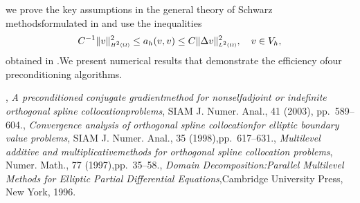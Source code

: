 \documentclass{report}
\begin{document}
we prove the key assumptions in the general theory of Schwarz methodsformulated in \cite{SBG_1996} and use the inequalities\[C^{-1}\|v\|_{\mbox{$\scriptscriptstyle H^{2}(\Omega)$}}^2\leq a_h(v,v)\leq C\|\Delta v\|_{\mbox{$\scriptscriptstyle L^{2}(\Omega)$}}^2,\quad v\in V_h,\]obtained in \cite{Bialecki_1998}.We present numerical results that demonstrate the efficiency ofour preconditioning algorithms.\begin{thebibliography}{1},
{\em A preconditioned conjugate gradientmethod for nonselfadjoint or indefinite orthogonal spline collocationproblems},
SIAM J.
Numer.
Anal.,
41 (2003),
pp.~589--604.,
{\em Convergence analysis of orthogonal spline collocationfor elliptic boundary value problems},
SIAM J.
Numer.
Anal.,
35 (1998),pp.~617--631.,
{\em Multilevel additive and multiplicativemethods for orthogonal spline collocation problems},
Numer.
Math.,
77 (1997),pp.~35--58.,
{\em Domain Decomposition:Parallel Multilevel Methods for Elliptic Partial Differential Equations},Cambridge University Press,
New York,
1996.\end{thebibliography}
\end{document}
